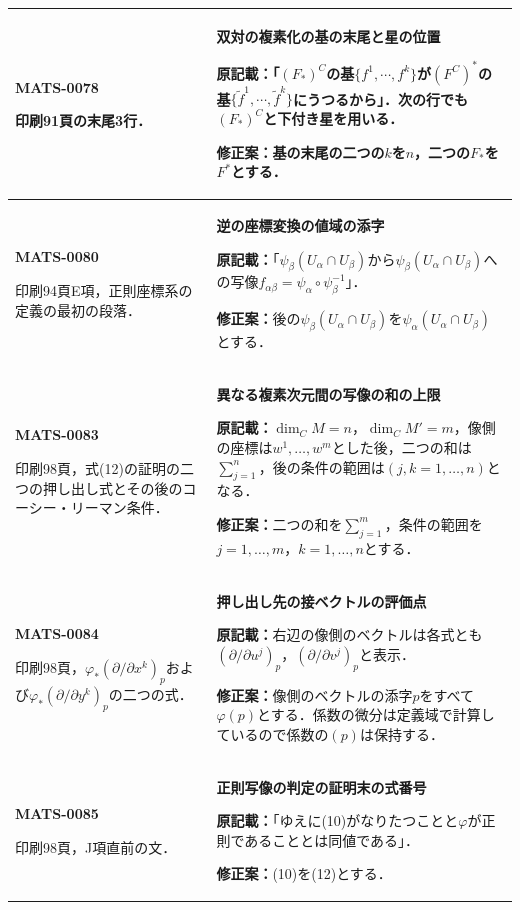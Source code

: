 \documentclass[a4paper,10pt]{ltjsarticle}
\begin{document}
\begin{longtable}{@{}>{\raggedright\arraybackslash}p{.19\linewidth}>{\raggedright\arraybackslash}p{.77\linewidth}@{}}
\hline
\hypertarget{MATS-0078}{}\textbf{MATS-0078}\par 印刷91頁の末尾3行． & \textbf{双対の複素化の基の末尾と星の位置}\par\textbf{原記載：}「$(F_*)^C$の基$\{f^1,\cdots,f^k\}$が$(F^C)^*$の基$\{\tilde f^1,\cdots,\tilde f^k\}$にうつるから」．次の行でも$(F_*)^C$と下付き星を用いる．\par\textbf{修正案：}基の末尾の二つの$k$を$n$，二つの$F_*$を$F^*$とする． \\[3pt]
\hline
\hypertarget{MATS-0080}{}\textbf{MATS-0080}\par 印刷94頁E項，正則座標系の定義の最初の段落． & \textbf{逆の座標変換の値域の添字}\par\textbf{原記載：}「$\psi_\beta(U_\alpha\cap U_\beta)$から$\psi_\beta(U_\alpha\cap U_\beta)$への写像$f_{\alpha\beta}=\psi_\alpha\circ\psi_\beta^{-1}$」．\par\textbf{修正案：}後の$\psi_\beta(U_\alpha\cap U_\beta)$を$\psi_\alpha(U_\alpha\cap U_\beta)$とする． \\[3pt]
\hline
\hypertarget{MATS-0083}{}\textbf{MATS-0083}\par 印刷98頁，式(12)の証明の二つの押し出し式とその後のコーシー・リーマン条件． & \textbf{異なる複素次元間の写像の和の上限}\par\textbf{原記載：}$\dim_C M=n$，$\dim_C M'=m$，像側の座標は$w^1,\ldots,w^m$とした後，二つの和は$\sum_{j=1}^n$，後の条件の範囲は$(j,k=1,\ldots,n)$となる．\par\textbf{修正案：}二つの和を$\sum_{j=1}^m$，条件の範囲を$j=1,\ldots,m$，$k=1,\ldots,n$とする． \\[3pt]
\hline
\hypertarget{MATS-0084}{}\textbf{MATS-0084}\par 印刷98頁，$\varphi_*(\partial/\partial x^k)_p$および$\varphi_*(\partial/\partial y^k)_p$の二つの式． & \textbf{押し出し先の接ベクトルの評価点}\par\textbf{原記載：}右辺の像側のベクトルは各式とも$(\partial/\partial u^j)_p$，$(\partial/\partial v^j)_p$と表示．\par\textbf{修正案：}像側のベクトルの添字$p$をすべて$\varphi(p)$とする．係数の微分は定義域で計算しているので係数の$(p)$は保持する． \\[3pt]
\hline
\hypertarget{MATS-0085}{}\textbf{MATS-0085}\par 印刷98頁，J項直前の文． & \textbf{正則写像の判定の証明末の式番号}\par\textbf{原記載：}「ゆえに(10)がなりたつことと$\varphi$が正則であることとは同値である」．\par\textbf{修正案：}(10)を(12)とする． \\[3pt]

\end{longtable}
\end{document}
